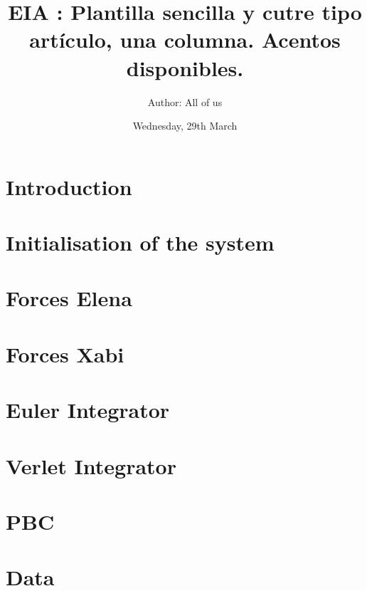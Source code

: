 \documentclass[onecolumn]{article}
\begin{document}
\pagestyle{fancy}


\title{EIA : Plantilla sencilla y cutre tipo artículo, una columna. Acentos disponibles.}
\author{Author: All of us}
\date{Wednesday, 29th March}

\maketitle

\section{Introduction}

\lipsum

\section{Initialisation of the system}

\lipsum

\section{Forces Elena}

\lipsum

\section{Forces Xabi}

\lipsum

\section{Euler Integrator}

\lipsum

\section{Verlet Integrator}

\lipsum

\section{PBC}

\lipsum

\section{Data}
\end{document}
